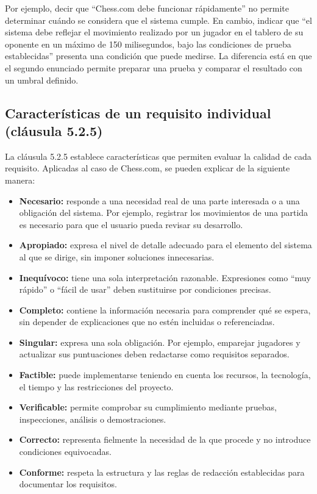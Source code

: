 \documentclass[12pt,a4paper]{article}
\begin{document}
Por ejemplo, decir que ``Chess.com debe funcionar rápidamente'' no permite determinar cuándo se considera que el sistema cumple. En cambio, indicar que ``el sistema debe reflejar el movimiento realizado por un jugador en el tablero de su oponente en un máximo de 150 milisegundos, bajo las condiciones de prueba establecidas'' presenta una condición que puede medirse. La diferencia está en que el segundo enunciado permite preparar una prueba y comparar el resultado con un umbral definido.

\subsection{Características de un requisito individual (cláusula 5.2.5)}

La cláusula 5.2.5 establece características que permiten evaluar la calidad de cada requisito. Aplicadas al caso de Chess.com, se pueden explicar de la siguiente manera:

\begin{itemize}[leftmargin=*]
    \item \textbf{Necesario:} responde a una necesidad real de una parte interesada o a una obligación del sistema. Por ejemplo, registrar los movimientos de una partida es necesario para que el usuario pueda revisar su desarrollo.
    \item \textbf{Apropiado:} expresa el nivel de detalle adecuado para el elemento del sistema al que se dirige, sin imponer soluciones innecesarias.
    \item \textbf{Inequívoco:} tiene una sola interpretación razonable. Expresiones como ``muy rápido'' o ``fácil de usar'' deben sustituirse por condiciones precisas.
    \item \textbf{Completo:} contiene la información necesaria para comprender qué se espera, sin depender de explicaciones que no estén incluidas o referenciadas.
    \item \textbf{Singular:} expresa una sola obligación. Por ejemplo, emparejar jugadores y actualizar sus puntuaciones deben redactarse como requisitos separados.
    \item \textbf{Factible:} puede implementarse teniendo en cuenta los recursos, la tecnología, el tiempo y las restricciones del proyecto.
    \item \textbf{Verificable:} permite comprobar su cumplimiento mediante pruebas, inspecciones, análisis o demostraciones.
    \item \textbf{Correcto:} representa fielmente la necesidad de la que procede y no introduce condiciones equivocadas.
    \item \textbf{Conforme:} respeta la estructura y las reglas de redacción establecidas para documentar los requisitos.
\end{itemize}
\end{document}
